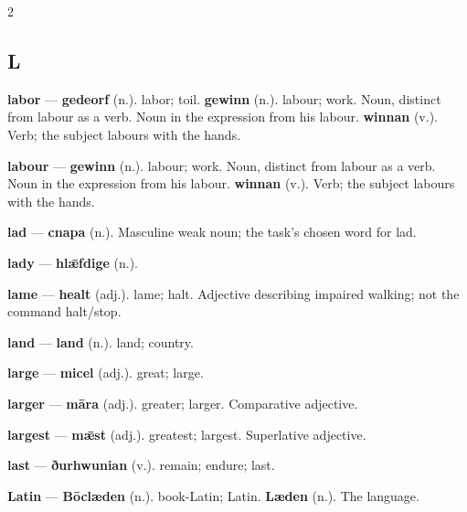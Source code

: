 \begin{multicols}{2}
\subsection*{L}
\textbf{labor} — \textbf{gedeorf} (n.). labor; toil. \textbf{gewinn} (n.). labour; work. Noun, distinct from labour as a verb. Noun in the expression from his labour. \textbf{winnan} (v.). Verb; the subject labours with the hands.\par
\textbf{labour} — \textbf{gewinn} (n.). labour; work. Noun, distinct from labour as a verb. Noun in the expression from his labour. \textbf{winnan} (v.). Verb; the subject labours with the hands.\par
\textbf{lad} — \textbf{cnapa} (n.). Masculine weak noun; the task's chosen word for lad.\par
\textbf{lady} — \textbf{hlǣfdige} (n.).\par
\textbf{lame} — \textbf{healt} (adj.). lame; halt. Adjective describing impaired walking; not the command halt/stop.\par
\textbf{land} — \textbf{land} (n.). land; country.\par
\textbf{large} — \textbf{micel} (adj.). great; large.\par
\textbf{larger} — \textbf{māra} (adj.). greater; larger. Comparative adjective.\par
\textbf{largest} — \textbf{mǣst} (adj.). greatest; largest. Superlative adjective.\par
\textbf{last} — \textbf{ðurhwunian} (v.). remain; endure; last.\par
\textbf{Latin} — \textbf{Bōclæden} (n.). book-Latin; Latin. \textbf{Læden} (n.). The language.\par

\end{multicols}
